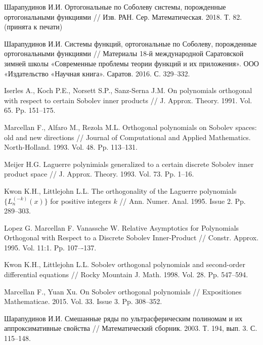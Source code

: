 \begin{thebibliography}{1}
{Шарапудинов И.И.}
Ортогональные по Соболеву системы, порожденные ортогональными функциями // Изв. РАН. Сер. Математическая. 2018. Т. 82. (принята к печати)





{Шарапудинов И.И.}
Системы функций, ортогональные по Соболеву, порожденные ортогональными функциями // Материалы 18-й международной Саратовской зимней школы «Современные проблемы теории функций и их приложения». ООО «Издательство «Научная книга». Саратов. 2016. С. 329--332.




{Iserles A., Koch P.E., Norsett S.P., Sanz-Serna J.M.}
On polynomials  orthogonal  with respect  to certain Sobolev inner products // J. Approx. Theory. 1991. Vol. 65. Pp. 151--175.

{Marcellan F., Alfaro M., Rezola M.L.}
Orthogonal polynomials on Sobolev spaces: old and new directions // Journal of Computational and Applied Mathematics. North-Holland. 1993. Vol. 48. Pp. 113--131.

{Meijer H.G.}
Laguerre polynimials generalized to a certain discrete Sobolev inner product space // J. Approx. Theory. 1993. Vol. 73. Pp. 1--16.


{Kwon K.H., Littlejohn L.L.}
The orthogonality of the Laguerre polynomials $\{L_n^{(-k)}(x)\}$ for positive integers $k$ // Ann. Numer. Anal. 1995. Issue 2. Pp. 289--303.

{Lopez G. Marcellan F. Vanassche W.}
Relative Asymptotics for Polynomials Orthogonal with Respect to a Discrete Sobolev Inner-Product // Constr. Approx. 1995. Vol. 11:1. Pp. 107–-137.



{Kwon K.H., Littlejohn L.L.}
Sobolev orthogonal polynomials and second-order differential equations // Rocky Mountain J. Math. 1998. Vol. 28. Pp. 547--594.


{Marcellan F., Yuan Xu.}
On Sobolev orthogonal polynomials // Expositiones Mathematicae. 2015. Vol. 33. Issue 3. Pp. 308--352.

{Шарапудинов И.И.}
Смешанные ряды по ультрасферическим полиномам и их аппроксимативные свойства // Математический сборник. 2003. Т. 194, вып. 3. С. 115--148.



\end{thebibliography}

